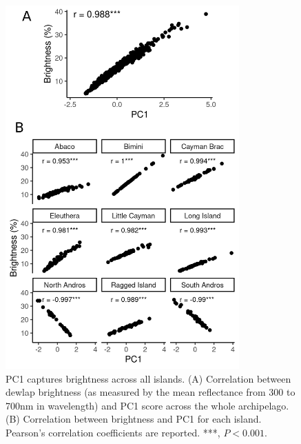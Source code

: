 \begin{figure}[H]
	\centering
	\includegraphics[width=0.8\textwidth]{figures/brightness.png}
	\caption{PC1 captures brightness across all islands. (A) Correlation between dewlap brightness (as measured by the mean reflectance from 300 to 700nm in wavelength) and PC1 score across the whole archipelago. (B) Correlation between brightness and PC1 for each island. Pearson's correlation coefficients are reported. ***, $P < 0.001$.}
	\label{fig:brightness}
\end{figure}
